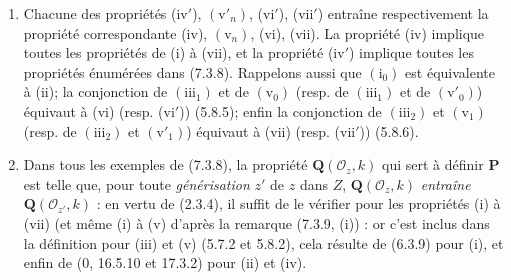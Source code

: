 \begin{remarks}[7.3.9]
\label{IV.2.s7.3.9-fr}
\begin{enumerate}
\item[\emph{i)}] Chacune des propriétés (iv$'$), $(\mathrm v'_n)$, (vi$'$),
(vii$'$) entraîne respectivement la propriété correspondante (iv),
$(\mathrm v_n)$, (vi), (vii). La propriété (iv) implique toutes les
propriétés de (i) à (vii), et la propriété (iv$'$) implique toutes les
propriétés énumérées dans (7.3.8). Rappelons aussi que $(\mathrm i_0)$ est
équivalente à (ii); la conjonction de $(\mathrm{iii}_1)$ et de
$(\mathrm v_0)$ (resp. de $(\mathrm{iii}_1)$ et de
$(\mathrm v'_0)$) équivaut à (vi) (resp. (vi$'$)) (5.8.5); enfin la
conjonction de $(\mathrm{iii}_2)$ et $(\mathrm v_1)$ (resp. de
$(\mathrm{iii}_2)$ et $(\mathrm v'_1)$) équivaut à (vii) (resp.
(vii$'$)) (5.8.6).
\item[\emph{ii)}] Dans tous les exemples de (7.3.8), la propriété
$\boldsymbol Q(\mathscr O_z,k)$ qui sert à définir $\boldsymbol P$ est
telle que, pour toute \emph{générisation} $z'$ de $z$ dans $Z$,
$\boldsymbol Q(\mathscr O_z,k)$ \emph{entraîne}
$\boldsymbol Q(\mathscr O_{z'},k)$ : en vertu de (2.3.4), il suffit de le
vérifier pour les propriétés (i) à (vii) (et même (i) à (v) d'après la
remarque (7.3.9, (i)) : or c'est inclus dans la définition pour (iii) et
(v) (5.7.2 et 5.8.2), cela résulte de (6.3.9) pour (i), et enfin de
(0, 16.5.10 et 17.3.2) pour (ii) et (iv).
\end{enumerate}
\end{remarks}


